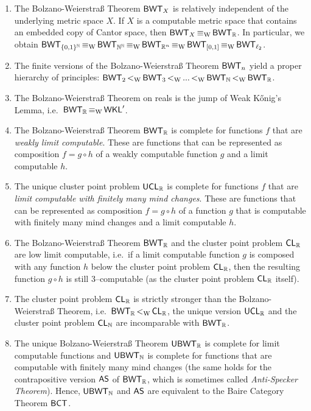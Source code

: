 \documentclass[a4paper]{amsart}
\def\IN{{\mathbb{N}}}
\def\IR{{\mathbb{R}}}
\def\Cantor{{\{0,1\}^\IN}}
\def\Baire{{\IN^\IN}}
\def\ll#1{\ell_{#1}}
\def\WKL{\text{\rm\sffamily WKL}}
\def\BCT{\text{\rm\sffamily BCT}}
\def\BWT{\text{\rm\sffamily BWT}}
\def\UBWT{\text{\rm\sffamily UBWT}}
\def\CL{\text{\rm\sffamily CL}}
\def\UCL{\text{\rm\sffamily UCL}}
\def\equivW{\mathop{\equiv_{\mathrm{W}}}}
\def\lW{\mathop{<_{\mathrm{W}}}}
\newcommand{\AS}{\text{\rm\sffamily AS}}
\theoremstyle{definition}
\begin{document}
\begin{enumerate}
\item The Bolzano-Weierstra\ss{} Theorem $\BWT_X$ is relatively independent of the underlying metric space $X$. 
         If $X$ is a computable metric space that contains an embedded copy of Cantor space, then $\BWT_X\equivW\BWT_\IR$.
         In particular, we obtain
         $\BWT_\Cantor\equivW\BWT_\Baire\equivW\BWT_{\IR^n}\equivW\BWT_{[0,1]}\equivW\BWT_{\ll{2}}$.
\item The finite versions of the Bolzano-Weierstra\ss{} Theorem $\BWT_n$ yield a proper hierarchy of principles:
         $\BWT_2\lW\BWT_3\lW...\lW\BWT_\IN\lW\BWT_\IR$.
\item The Bolzano-Weierstra\ss{} Theorem on reals is the jump of Weak K\H{o}nig's Lemma, i.e.\ $\BWT_\IR\equivW\WKL'$.
\item The Bolzano-Weierstra\ss{} Theorem $\BWT_\IR$ is complete for functions $f$ that are {\em weakly limit computable}.
         These are functions that can be represented as composition $f=g\circ h$ of a weakly computable function $g$
         and a limit computable $h$.
\item The unique cluster point problem $\UCL_\IR$ is complete for functions $f$ that are {\em limit computable with finitely many mind changes}.
        These are functions that can be represented as composition $f=g\circ h$ of a function $g$ that is computable with finitely many mind changes
        and a limit computable $h$.
\item The Bolzano-Weierstra\ss{} Theorem $\BWT_\IR$ and the cluster point problem $\CL_\IR$ are low limit computable, i.e.\
         if a limit computable function $g$ is composed with any function $h$ below the cluster point problem $\CL_\IR$, then 
         the resulting function $g\circ h$ is still $3$--computable (as the cluster point problem $\CL_\IR$ itself).
\item The cluster point problem $\CL_\IR$ is strictly stronger than the Bolzano-Weier\-stra\ss{} Theorem, i.e.\ $\BWT_\IR\lW\CL_\IR$,
         the unique version $\UCL_\IR$ and the cluster point problem $\CL_\IN$ are incomparable with $\BWT_\IR$.
\item The unique Bolzano-Weierstra\ss{} Theorem $\UBWT_\IR$ is complete for limit computable functions and $\UBWT_\IN$ is
         complete for functions that are computable with finitely many mind changes (the same holds for the contrapositive version $\AS$ 
         of $\BWT_\IR$, which is sometimes called {\em Anti-Specker Theorem}). Hence, $\UBWT_\IN$ and $\AS$ are equivalent to the
         Baire Category Theorem $\BCT$.
\end{enumerate}
\end{document}
